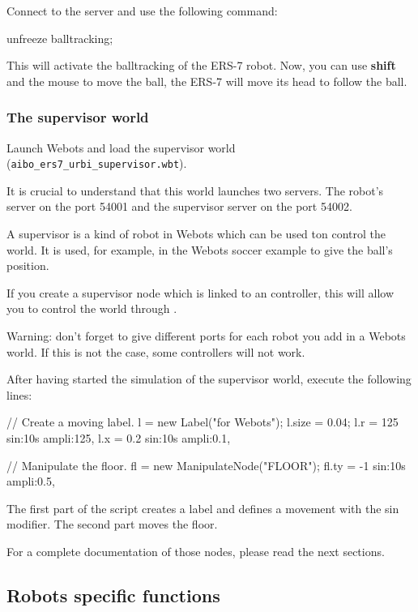Connect to the \urbi server and use the following command:

\begin{urbifixme}
unfreeze balltracking;
\end{urbifixme}

 This will activate the balltracking of the ERS-{}7 robot.
Now, you can use \textbf{shift} and the mouse to move
the ball, the ERS-{}7 will move its head to follow the ball.


\subsubsection{The supervisor world}
\label{webots.builtin.worlds.supervisor}%

 Launch Webots and load the supervisor world
(\nolinkurl{aibo_ers7_urbi_supervisor.wbt}).


 It is crucial to understand that this world launches two \urbi servers.
The robot's server on the port 54001 and the supervisor server on the
port 54002.


 A supervisor is a kind of robot in Webots which can be used ton control
the world. It is used, for example, in the Webots soccer example to give
the ball's position.


 If you create a supervisor node which is linked to an \urbi controller,
this will allow you to control the world through \urbi.


 Warning: don't forget to give different ports for each robot you add in a
Webots world. If this is not the case, some controllers will not work.


 After having started the simulation of the supervisor world, execute
the following lines:


\begin{urbifixme}
// Create a moving label.
l = new Label("\urbi for Webots");
l.size = 0.04;
l.r = 125 sin:10s ampli:125,
l.x = 0.2 sin:10s ampli:0.1,

// Manipulate the floor.
fl = new ManipulateNode("FLOOR");
fl.ty = -1 sin:10s ampli:0.5,
\end{urbifixme}

 The first part of the script creates a label and defines a movement
with the sin modifier. The second part moves the floor.


For a complete documentation of those nodes, please read the
next sections.

\subsection{Robots specific functions}
\label{webots.builtin.robots}%

